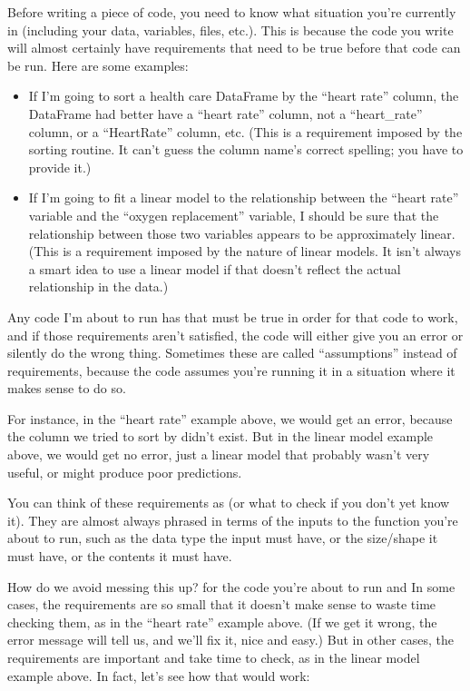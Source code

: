 \documentclass[letterpaper,10pt,english]{sphinxmanual}
\begin{document}
Before writing a piece of code, you need to know what situation you’re currently in (including your data, variables, files, etc.).  This is because the code you write will almost certainly have requirements that need to be true before that code can be run.  Here are some examples:
\begin{itemize}
\item {} 
If I’m going to sort a health care DataFrame by the “heart rate” column, the DataFrame had better have a “heart rate” column, not a “heart\_rate” column, or a “HeartRate” column, etc.  (This is a requirement imposed by the sorting routine.  It can’t guess the column name’s correct spelling; you have to provide it.)

\item {} 
If I’m going to fit a linear model to the relationship between the “heart rate” variable and the “oxygen replacement” variable, I should be sure that the relationship between those two variables appears to be approximately linear.  (This is a requirement imposed by the nature of linear models.  It isn’t always a smart idea to use a linear model if that doesn’t reflect the actual relationship in the data.)

\end{itemize}

Any code I’m about to run has  that must be true in order for that code to work, and if those requirements aren’t satisfied, the code will either give you an error or silently do the wrong thing.  Sometimes these are called “assumptions” instead of requirements, because the code assumes you’re running it in a situation where it makes sense to do so.

For instance, in the “heart rate” example above, we would get an error, because the column we tried to sort by didn’t exist.  But in the linear model example above, we would get no error, just a linear model that probably wasn’t very useful, or might produce poor predictions.

You can think of these requirements as  (or what to check if you don’t yet know it).  They are almost always phrased in terms of the inputs to the function you’re about to run, such as the data type the input must have, or the size/shape it must have, or the contents it must have.

How do we avoid messing this up?   for the code you’re about to run and   In some cases, the requirements are so small that it doesn’t make sense to waste time checking them, as in the “heart rate” example above.  (If we get it wrong, the error message will tell us, and we’ll fix it, nice and easy.)  But in other cases, the requirements are important and take time to check, as in the linear model example above.  In fact, let’s see how that would work:
\end{document}
